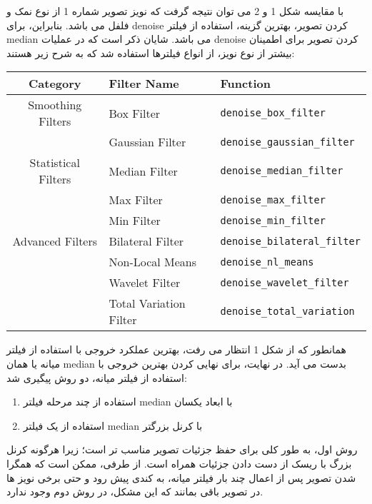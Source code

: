 \documentclass[a4paper,12pt]{article}
\begin{document}
با مقایسه شکل 1 و 2 می توان نتیجه گرفت که نویز تصویر شماره 1 از نوع نمک و فلفل می باشد. بنابراین، برای denoise کردن تصویر، بهترین گزینه، استفاده از فیلتر median می باشد. 
شایان ذکر است که در عملیات denoise کردن تصویر برای اطمینان بیشتر از نوع نویز، از انواع فیلترها استفاده شد که به شرح زیر هستند:
\begin{latin}
\begin{table}[ht]
	\centering
	\begin{tabular}{|c|l|l|}
		\hline
		\textbf{Category} & \textbf{Filter Name} & \textbf{Function} \\
		\hline
		Smoothing Filters  & Box Filter              & \texttt{denoise\_box\_filter} \\
		& Gaussian Filter         & \texttt{denoise\_gaussian\_filter} \\
		\hline
		Statistical Filters & Median Filter           & \texttt{denoise\_median\_filter} \\
		& Max Filter              & \texttt{denoise\_max\_filter} \\
		& Min Filter              & \texttt{denoise\_min\_filter} \\
		\hline
		Advanced Filters   & Bilateral Filter        & \texttt{denoise\_bilateral\_filter} \\
		& Non-Local Means         & \texttt{denoise\_nl\_means} \\
		& Wavelet Filter          & \texttt{denoise\_wavelet\_filter} \\
		& Total Variation Filter  & \texttt{denoise\_total\_variation} \\
		\hline
	\end{tabular}
\end{table}
\end{latin}

همانطور که از شکل 1 انتظار می رفت، بهترین عملکرد خروجی با استفاده از فیلتر میانه یا همان median بدست می آید. در نهایت، برای نهایی کردن بهترین خروجی با استفاده از فیلتر میانه، دو روش پیگیری شد:
\begin{enumerate}
	\item 
	استفاده از چند مرحله فیلتر median با ابعاد یکسان
	\item 
	استفاده از یک فیلتر median با کرنل بزرگتر
\end{enumerate}
روش اول، به طور کلی برای حفظ جزئیات تصویر مناسب تر است؛ زیرا هرگونه کرنل بزرگ  با ریسک از دست دادن جزئیات همراه است. از طرفی، ممکن است که همگرا شدن تصویر پس از اعمال چند بار فیلتر میانه، به کندی پیش رود و حتی برخی نویز ها در تصویر باقی بمانند که این مشکل، در روش دوم وجود ندارد. 
\end{document}
